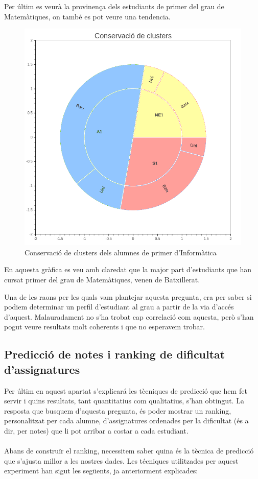 \documentclass[12pt,a4paper,catalan]{article}
\begin{document}
\newpage

Per últim es veurà la provinença dels estudiants de primer del grau de Matemàtiques, on també es pot veure una tendencia.

\begin{figure}[h]
\centering
\includegraphics[width=.6\linewidth]{img/conservacio_clusters_primer_mates.png}
\caption{Conservació de clusters dels alumnes de primer d'Informàtica}
\end{figure}

En aquesta gràfica es veu amb claredat que la major part d'estudiants que han cursat primer del grau de Matemàtiques, venen de Batxillerat. 

Una de les raons per les quals vam plantejar aquesta pregunta, era per saber si podiem determinar un perfil d'estudiant al grau a partir de la via d'accés d'aquest. Malauradament no s'ha trobat cap correlació com aquesta, però s'han pogut veure resultats molt coherents i que no esperavem trobar.

\newpage

\subsection{Predicció de notes i ranking de dificultat d'assignatures}
Per últim en aquest apartat s'explicará  les tècniques de predicció que hem fet servir i quins resultats, tant quantitatius com qualitatius, s'han obtingut. La resposta que busquem d'aquesta pregunta, és poder mostrar un ranking, personalitzat per cada alumne, d'assignatures ordenades per la dificultat (és a dir, per notes) que li pot arribar a costar a cada estudiant.
\\
\\
Abans de construïr el ranking, necessitem saber quina és la tècnica de predicció que s'ajusta millor a les nostres dades. Les técniques utilitzades per aquest experiment han sigut les següents, ja anteriorment explicades:
\end{document}
